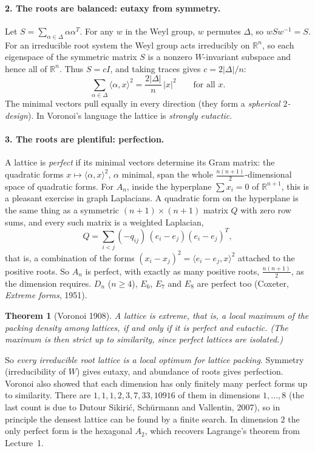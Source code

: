 \documentclass[11pt,openany]{book}
\theoremstyle{plain}
\newtheorem{theorem}{Theorem}[chapter]
\theoremstyle{definition}
\theoremstyle{remark}
\newcommand{\R}{\mathbb{R}}
\newcommand{\abs}[1]{\left\lvert #1 \right\rvert}
\newcommand{\ip}[2]{\langle #1, #2\rangle}
\begin{document}
\paragraph{2. The roots are balanced: eutaxy from symmetry.} Let
$S=\sum_{\alpha\in\Delta}\alpha\alpha^T$. For any $w$ in the Weyl group, $w$ permutes $\Delta$, so
$wSw^{-1}=S$. For an irreducible root system the Weyl group acts irreducibly on $\R^n$, so each
eigenspace of the symmetric matrix $S$ is a nonzero $W$-invariant subspace and hence all of $\R^n$.
Thus $S=cI$, and taking traces gives $c=2\abs{\Delta}/n$:
\[
  \sum_{\alpha\in\Delta}\ip{\alpha}{x}^2=\frac{2\abs{\Delta}}{n}\,\abs{x}^2\qquad\text{for all }x.
\]
The minimal vectors pull equally in every direction (they form a \emph{spherical $2$-design}). In
Voronoi's language the lattice is \emph{strongly eutactic}.

\paragraph{3. The roots are plentiful: perfection.} A lattice is \emph{perfect} if its minimal vectors
determine its Gram matrix: the quadratic forms $x\mapsto\ip{\alpha}{x}^2$, $\alpha$ minimal, span the whole
$\frac{n(n+1)}2$-dimensional space of quadratic forms. For $A_n$, inside the hyperplane $\sum x_i=0$ of
$\R^{n+1}$, this is a pleasant exercise in graph Laplacians. A quadratic form on the hyperplane is the
same thing as a symmetric $(n+1)\times(n+1)$ matrix $Q$ with zero row sums, and every such matrix is a
weighted Laplacian,
\[
  Q=\sum_{i<j}(-q_{ij})\,(e_i-e_j)(e_i-e_j)^T,
\]
that is, a combination of the forms $(x_i-x_j)^2=\ip{e_i-e_j}{x}^2$ attached to the positive roots. So
$A_n$ is perfect, with exactly as many positive roots, $\frac{n(n+1)}2$, as the dimension requires.
$D_n$ ($n\ge4$), $E_6$, $E_7$ and $E_8$ are perfect too (Coxeter, \emph{Extreme forms}, 1951).

\begin{theorem}[Voronoi 1908]\label{L04b:thm:voronoi}
A lattice is \emph{extreme}, that is, a local maximum of the packing density among lattices, if and
only if it is perfect and eutactic. (The maximum is then strict up to similarity, since perfect lattices
are isolated.)
\end{theorem}

\noindent So \emph{every irreducible root lattice is a local optimum for lattice packing}. Symmetry
(irreducibility of $W$) gives eutaxy, and abundance of roots gives perfection. Voronoi also showed that
each dimension has only finitely many perfect forms up to similarity. There are $1,1,1,2,3,7,33,10916$ of
them in dimensions $1,\dots,8$ (the last count is due to Dutour Sikiri\'c, Sch\"urmann and Vallentin,
2007), so in principle the densest lattice can be found by a finite search. In dimension $2$ the only
perfect form is the hexagonal $A_2$, which recovers Lagrange's theorem from Lecture~1.
\end{document}
